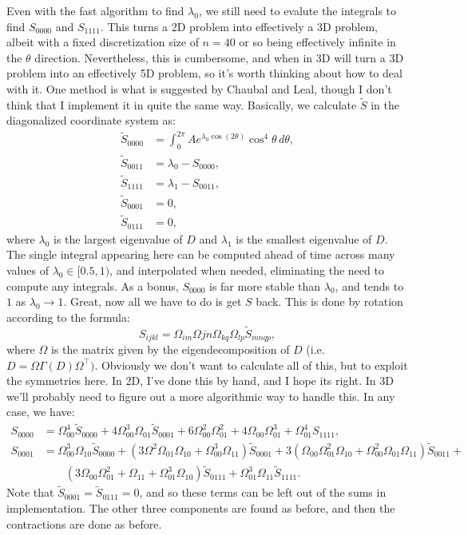 \documentclass{article}
\begin{document}
Even with the fast algorithm to find $\lambda_0$, we still need to evalute the integrals to find $S_{0000}$ and $S_{1111}$. This turns a 2D problem into effectively a 3D problem, albeit with a fixed discretization size of $n=40$ or so being effectively infinite in the $\theta$ direction. Nevertheless, this is cumbersome, and when in 3D will turn a 3D problem into an effectively 5D problem, so it's worth thinking about how to deal with it. One method is what is suggested by Chaubal and Leal, though I don't think that I implement it in quite the same way. Basically, we calculate $\tilde S$ in the diagonalized coordinate system as:
\begin{align}
    \tilde S_{0000} &= \int_0^{2\pi}Ae^{\lambda_{0}\cos(2\theta)}\cos^4\theta\,d\theta, \\
    \tilde S_{0011} &= \lambda_0 - S_{0000},    \\
    \tilde S_{1111} &= \lambda_1 - S_{0011},    \\
    \tilde S_{0001} &= 0, \\
    \tilde S_{0111} &= 0,
\end{align}
where $\lambda_0$ is the largest eigenvalue of $D$ and $\lambda_1$ is the smallest eigenvalue of $D$. The single integral appearing here can be computed ahead of time across many values of $\lambda_0\in[0.5,1)$, and interpolated when needed, eliminating the need to compute any integrals. As a bonus, $S_{0000}$ is far more stable than $\lambda_0$, and tends to $1$ as $\lambda_0\to1$. Great, now all we have to do is get $S$ back. This is done by rotation according to the formula:
\begin{equation}
    S_{ijkl} = \Omega_{im}\Omega{jn}\Omega_{kq}\Omega_{lp}\tilde S_{mnqp},
\end{equation}
where $\Omega$ is the matrix given by the eigendecomposition of $D$ (i.e. $D=\Omega\Gamma(D)\Omega^\intercal)$. Obviously we don't want to calculate all of this, but to exploit the symmetries here. In 2D, I've done this by hand, and I hope its right. In 3D we'll probably need to figure out a more algorithmic way to handle this. In any case, we have:
\begin{align}
    S_{0000} &= \Omega_{00}^4\tilde S_{0000} + 4\Omega_{00}^3\Omega_{01}\tilde S_{0001} + 6\Omega_{00}^2\Omega_{01}^2 + 4\Omega_{00}\Omega_{01}^3 + \Omega_{01}^4 S_{1111},  \\
    S_{0001} &= \Omega_{00}^3\Omega_{10}\tilde S_{0000} + (3\Omega^2\Omega_{01}\Omega_{10} + \Omega_{00}^3\Omega_{11})\tilde S_{0001} + 3(\Omega_{00}\Omega_{01}^2\Omega_{10} + \Omega_{00}^2\Omega_{01}\Omega_{11})\tilde S_{0011} +   \\
        &\qquad(3\Omega_{00}\Omega_{01}^2+\Omega_{11}+\Omega_{01}^3\Omega_{10})\tilde S_{0111} + \Omega_{01}^3\Omega_{11}\tilde S_{1111}.
\end{align}
Note that $\tilde S_{0001}=\tilde S_{0111}=0$, and so these terms can be left out of the sums in implementation. The other three components are found as before, and then the contractions are done as before.
\end{document}
